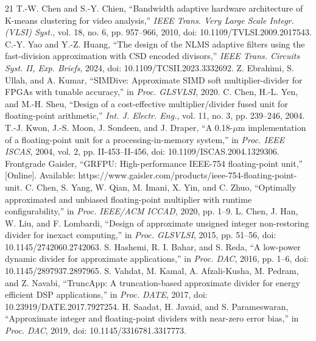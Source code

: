 \documentclass[conference]{IEEEtran}
\begin{document}
\clearpage
\nobalance
\raggedbottom
{}
\begin{thebibliography}{21}
T.-W. Chen and S.-Y. Chien, ``Bandwidth adaptive hardware architecture of
K-means clustering for video analysis,'' \emph{IEEE Trans. Very Large Scale
Integr. (VLSI) Syst.}, vol. 18, no. 6, pp. 957--966, 2010,
doi: 10.1109/TVLSI.2009.2017543.
C.-Y. Yao and Y.-Z. Huang, ``The design of the NLMS adaptive filters using the
fast-division approximation with CSD encoded divisors,'' \emph{IEEE Trans.
Circuits Syst. II, Exp. Briefs}, 2024, doi: 10.1109/TCSII.2023.3332692.
Z. Ebrahimi, S. Ullah, and A. Kumar, ``SIMDive: Approximate SIMD soft
multiplier-divider for FPGAs with tunable accuracy,'' in \emph{Proc. GLSVLSI},
2020.
C. Chen, H.-L. Yen, and M.-H. Sheu, ``Design of a cost-effective
multiplier/divider fused unit for floating-point arithmetic,''
\emph{Int. J. Electr. Eng.}, vol. 11, no. 3, pp. 239--246, 2004.
T.-J. Kwon, J.-S. Moon, J. Sondeen, and J. Draper, ``A 0.18-$\mu$m
implementation of a floating-point unit for a processing-in-memory system,''
in \emph{Proc. IEEE ISCAS}, 2004, vol. 2, pp. II-453--II-456,
doi: 10.1109/ISCAS.2004.1329306.
Frontgrade Gaisler, ``GRFPU: High-performance IEEE-754 floating-point unit,''
[Online]. Available: https://www.gaisler.com/products/ieee-754-floating-point-unit.
C. Chen, S. Yang, W. Qian, M. Imani, X. Yin, and C. Zhuo,
``Optimally approximated and unbiased floating-point multiplier with runtime
configurability,'' in \emph{Proc. IEEE/ACM ICCAD}, 2020, pp. 1--9.
L. Chen, J. Han, W. Liu, and F. Lombardi, ``Design of approximate unsigned
integer non-restoring divider for inexact computing,'' in \emph{Proc. GLSVLSI},
2015, pp. 51--56, doi: 10.1145/2742060.2742063.
S. Hashemi, R. I. Bahar, and S. Reda, ``A low-power dynamic divider for
approximate applications,'' in \emph{Proc. DAC}, 2016, pp. 1--6,
doi: 10.1145/2897937.2897965.
S. Vahdat, M. Kamal, A. Afzali-Kusha, M. Pedram, and Z. Navabi,
``TruncApp: A truncation-based approximate divider for energy efficient DSP
applications,'' in \emph{Proc. DATE}, 2017,
doi: 10.23919/DATE.2017.7927254.
H. Saadat, H. Javaid, and S. Parameswaran, ``Approximate integer and
floating-point dividers with near-zero error bias,'' in \emph{Proc. DAC},
2019, doi: 10.1145/3316781.3317773.

\end{thebibliography}
\end{document}
